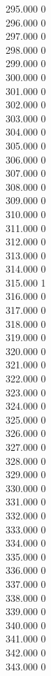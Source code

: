 { 295.000	0 \\
 296.000	0 \\
 297.000	0 \\
 298.000	0 \\
 299.000	0 \\
 300.000	0 \\
 301.000	0 \\
 302.000	0 \\
 303.000	0 \\
 304.000	0 \\
 305.000	0 \\
 306.000	0 \\
 307.000	0 \\
 308.000	0 \\
 309.000	0 \\
 310.000	0 \\
 311.000	0 \\
 312.000	0 \\
 313.000	0 \\
 314.000	0 \\
 315.000	1 \\
 316.000	0 \\
 317.000	0 \\
 318.000	0 \\
 319.000	0 \\
 320.000	0 \\
 321.000	0 \\
 322.000	0 \\
 323.000	0 \\
 324.000	0 \\
 325.000	0 \\
 326.000	0 \\
 327.000	0 \\
 328.000	0 \\
 329.000	0 \\
 330.000	0 \\
 331.000	0 \\
 332.000	0 \\
 333.000	0 \\
 334.000	0 \\
 335.000	0 \\
 336.000	0 \\
 337.000	0 \\
 338.000	0 \\
 339.000	0 \\
 340.000	0 \\
 341.000	0 \\
 342.000	0 \\
 343.000	0 \\
}
